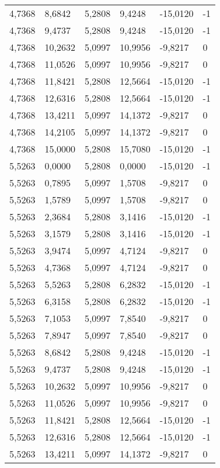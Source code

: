 \begin{longtable}{@{}llllll@{}}
		4,7368  & 8,6842  & 5,2808  & 9,4248  & -15,0120 & -1 \\
		4,7368  & 9,4737  & 5,2808  & 9,4248  & -15,0120 & -1 \\
		4,7368  & 10,2632 & 5,0997  & 10,9956 & -9,8217  & 0  \\
		4,7368  & 11,0526 & 5,0997  & 10,9956 & -9,8217  & 0  \\
		4,7368  & 11,8421 & 5,2808  & 12,5664 & -15,0120 & -1 \\
		4,7368  & 12,6316 & 5,2808  & 12,5664 & -15,0120 & -1 \\
		4,7368  & 13,4211 & 5,0997  & 14,1372 & -9,8217  & 0  \\
		4,7368  & 14,2105 & 5,0997  & 14,1372 & -9,8217  & 0  \\
		4,7368  & 15,0000 & 5,2808  & 15,7080 & -15,0120 & -1 \\
		5,5263  & 0,0000  & 5,2808  & 0,0000  & -15,0120 & -1 \\
		5,5263  & 0,7895  & 5,0997  & 1,5708  & -9,8217  & 0  \\
		5,5263  & 1,5789  & 5,0997  & 1,5708  & -9,8217  & 0  \\
		5,5263  & 2,3684  & 5,2808  & 3,1416  & -15,0120 & -1 \\
		5,5263  & 3,1579  & 5,2808  & 3,1416  & -15,0120 & -1 \\
		5,5263  & 3,9474  & 5,0997  & 4,7124  & -9,8217  & 0  \\
		5,5263  & 4,7368  & 5,0997  & 4,7124  & -9,8217  & 0  \\
		5,5263  & 5,5263  & 5,2808  & 6,2832  & -15,0120 & -1 \\
		5,5263  & 6,3158  & 5,2808  & 6,2832  & -15,0120 & -1 \\
		5,5263  & 7,1053  & 5,0997  & 7,8540  & -9,8217  & 0  \\
		5,5263  & 7,8947  & 5,0997  & 7,8540  & -9,8217  & 0  \\
		5,5263  & 8,6842  & 5,2808  & 9,4248  & -15,0120 & -1 \\
		5,5263  & 9,4737  & 5,2808  & 9,4248  & -15,0120 & -1 \\
		5,5263  & 10,2632 & 5,0997  & 10,9956 & -9,8217  & 0  \\
		5,5263  & 11,0526 & 5,0997  & 10,9956 & -9,8217  & 0  \\
		5,5263  & 11,8421 & 5,2808  & 12,5664 & -15,0120 & -1 \\
		5,5263  & 12,6316 & 5,2808  & 12,5664 & -15,0120 & -1 \\
		5,5263  & 13,4211 & 5,0997  & 14,1372 & -9,8217  & 0  \\

\end{longtable}
